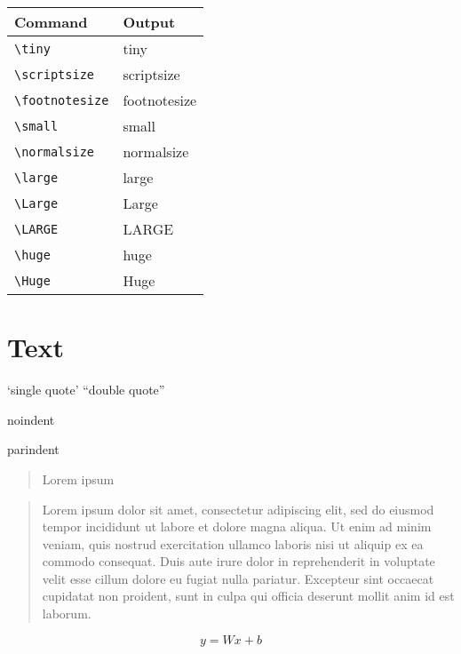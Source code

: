 \begin{tabular}{l|l}
  Command              & Output                       \\\hline
  \verb|\tiny|         & {\tiny tiny}                 \\
  \verb|\scriptsize|   & {\scriptsize scriptsize}     \\
  \verb|\footnotesize| & {\footnotesize footnotesize} \\
  \verb|\small|        & {\small small}               \\
  \verb|\normalsize|   & {\normalsize normalsize}     \\
  \verb|\large|        & {\large large}               \\
  \verb|\Large|        & {\Large Large}               \\
  \verb|\LARGE|        & {\LARGE LARGE}               \\
  \verb|\huge|         & {\huge huge}                 \\
  \verb|\Huge|         & {\Huge Huge}                 \\
\end{tabular}

\section{Text}

`single quote' ``double quote''

{
  \noindent
  noindent
}

{
  \setlength{\parindent}{1em}
  parindent
}

\begin{quote}
  Lorem ipsum
\end{quote}

\begin{quotation}
  Lorem ipsum dolor sit amet, consectetur adipiscing elit, sed do eiusmod tempor incididunt ut labore et dolore magna aliqua. Ut enim ad minim veniam, quis nostrud exercitation ullamco laboris nisi ut aliquip ex ea commodo consequat. Duis aute irure dolor in reprehenderit in voluptate velit esse cillum dolore eu fugiat nulla pariatur. Excepteur sint occaecat cupidatat non proident, sunt in culpa qui officia deserunt mollit anim id est laborum.
\end{quotation}

\begin{equation}
  y = Wx + b
\end{equation}

